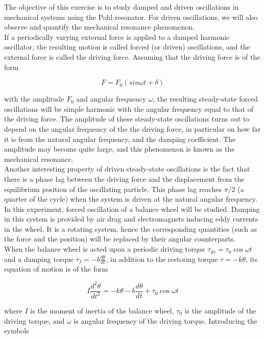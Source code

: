 \documentclass{article}
\begin{document}
The objective of this exercise is to study damped and driven oscillations in mechanical systems using the Pohl resonator. For driven oscillations, we will also observe and quantify the mechanical resonance phenomenon.
\\

If a periodically varying external force is applied to a damped harmonic oscillator, the resulting motion is called forced (or driven) oscillations, and the external force is called the driving force. Assuming that the driving force is of the form

$$F=F_0(sin \omega t+\delta)$$

with the amplitude $F_0$ and angular frequency $\omega$, the resulting steady-state forced oscillations will be simple harmonic with the angular frequency equal to that of the driving force. The amplitude of these steady-state oscillations turns out to depend on the angular frequency of the the driving force, in particular on how far it is from the natural angular frequency, and the damping coefficient. The amplitude may become quite large, and this phenomenon is known as the mechanical resonance.
\\

Another interesting property of driven steady-state oscillations is the fact that there is a phase lag between the driving force and the displacement from the equilibrium position of the oscillating particle. This phase lag reaches $\pi/2$ (a quarter of the cycle) when the system is driven at the natural angular frequency.
\\

In this experiment, forced oscillation of a balance wheel will be studied. Damping in this system is provided by air drag and electromagnets inducing eddy currents in the wheel. It is a rotating system, hence the corresponding quantities (such as the force and the position) will be replaced by their angular counterparts.\\

When the balance wheel is acted upon a periodic driving torque $\tau_{dr}=\tau_0\cos\omega t$ and a damping torque
$\tau_f=-b\frac{d\theta}{dt}$, in addition to the restoring torque $\tau=−k\theta$, its equation of motion is of the form

\begin{equation}\label{eq-1}
I\dfrac{d^2\theta}{dt^2}=-k\theta-b\dfrac{d\theta}{dt}+\tau_0\cos\omega t
\end{equation}

where $I$ is the moment of inertia of the balance wheel, $\tau_0$ is the amplitude of the driving torque, and $\omega$ is angular frequency of the driving torque. Introducing the symbols
\end{document}
